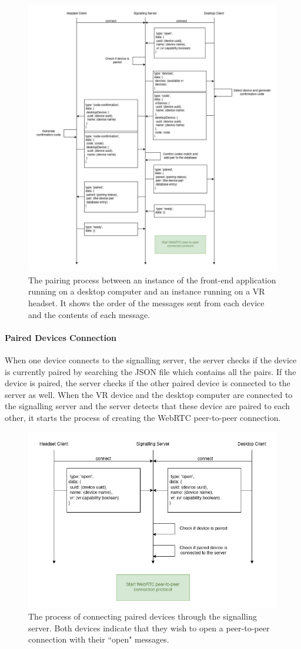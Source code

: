 \begin{figure}
    \centering
    \includegraphics[width=0.6\linewidth]{figures/pairing-process.jpg}
    \caption{The pairing process between an instance of the front-end application running on a desktop computer and an instance running on a VR headset. It shows the order of the messages sent from each device and the contents of each message.}
    \label{fig:pairing-process}
\end{figure}

\paragraph{Paired Devices Connection}
When one device connects to the signalling server, the server checks if the device is currently paired by searching the JSON file which contains all the pairs.
If the device is paired, the server checks if the other paired device is connected to the server as well.
When the VR device and the desktop computer are connected to the signalling server and the server detects that these device are paired to each other, it starts the process of creating the WebRTC peer-to-peer connection.

\begin{figure}
    \centering
    \includegraphics[width=0.6\linewidth]{figures/connect-paired-devices.jpg}
    \caption{The process of connecting paired devices through the signalling server. Both devices indicate that they wish to open a peer-to-peer connection with their ``open" messages.}
    \label{fig:connect-paired-devices}
\end{figure}

